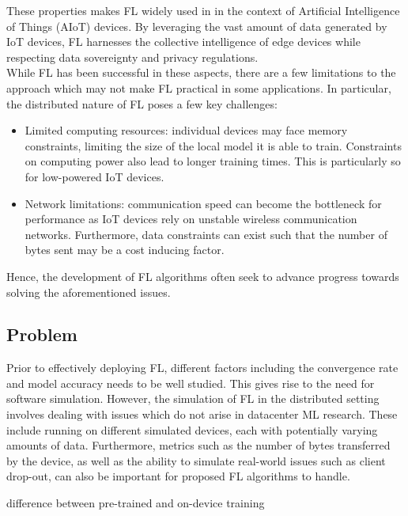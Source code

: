 \documentclass[12pt]{article}
\begin{document}
These properties makes FL widely used in in the context of Artificial Intelligence of Things
(AIoT) devices. By leveraging the vast amount of data generated by IoT devices, FL harnesses the
collective intelligence of edge devices while respecting data sovereignty and privacy
regulations.\\

While FL has been successful in these aspects, there are a few limitations to the approach which may
not make FL practical in some applications. In particular, the distributed nature of FL poses a few key challenges:

\begin{itemize}
  \item Limited computing resources: individual devices may face memory constraints, limiting the
    size of the local model it is able to train. Constraints on computing power also lead to
    longer training times. This is particularly so for low-powered IoT devices.
  \item Network limitations: communication speed can become the bottleneck for performance as IoT
    devices rely on unstable wireless communication networks. Furthermore, data constraints can
    exist such that the number of bytes sent may be a cost inducing factor.
\end{itemize}

Hence, the development of FL algorithms often seek to advance progress towards solving the
aforementioned issues.

\subsection{Problem}
Prior to effectively deploying FL, different factors including the convergence rate and
model accuracy needs to be well studied. This gives rise to the need for software simulation. However, the
simulation of FL in the distributed setting involves dealing with
issues which do not arise in datacenter ML research. These include running on different simulated
devices, each with potentially varying amounts of data. Furthermore, metrics such as the number of
bytes transferred by the device, as well as the ability to simulate real-world issues such as client
drop-out, can also be important for proposed FL algorithms to handle.

difference between pre-trained and on-device training
\end{document}
